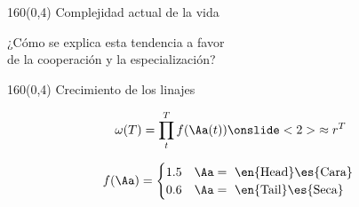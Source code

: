 \documentclass[shownotes,aspectratio=169]{beamer}
\begin{document}
\begin{frame}[plain]
\begin{textblock}{160}(0,4)
 \centering \LARGE Complejidad actual de la vida
\end{textblock}
\vspace{1.5cm} \centering \Large 

¿Cómo se explica esta tendencia a favor  \\ de la cooperación y la especialización?

\end{frame}


\begin{frame}[plain]
\begin{textblock}{160}(0,4)
 \centering \LARGE
Crecimiento de los linajes
\end{textblock}
\vspace{1cm}

\begin{equation*} 
\omega(T) = \prod_t^T f(\Aa(t)) \onslide<2>{\approx r^T }
\end{equation*}

\vspace{0.3cm}

\begin{equation*}
f(\Aa) =
\begin{cases}
 1.5 & \Aa = \text{ \en{Head}\es{Cara} } \\
 0.6 & \Aa = \text{ \en{Tail}\es{Seca} }
\end{cases}
\end{equation*}

\pause \centering \vspace{1cm} 


\end{frame}
\end{document}
